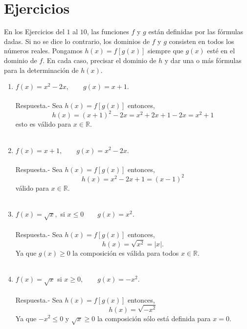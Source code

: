 \section{Ejercicios}

En los Ejercicios del $1$ al $10$, las funciones $f$ y $g$ están definidas por las fórmulas dadas. Si no se dice lo contrario, los dominios de $f$ y $g$ consisten en todos los números reales. Pongamos $h(x)=f[g(x)]$ siempre que $g(x)$ esté en el dominio de $f$. En cada caso, precisar el dominio de $h$ y dar una o más fórmulas para la determinación de $h(x)$.\\

\begin{enumerate}[\bfseries 1.]

    \item $f(x)=x^2-2x, \qquad g(x)=x+1$.\\\\
	Respuesta.- Sea $h(x)=f[g(x)]$ entonces,
	$$h(x)=(x+1)^2-2x = x^2+2x+1-2x = x^2+1$$
	esto es válido para $x\in \mathbb{R}$.\\\\


    \item $f(x)=x+1, \qquad g(x)=x^2-2x$.\\\\
	Respuesta.- Sea $h(x)=f[g(x)]$ entonces,
	$$h(x)=x^2-2x+1 = (x-1)^2$$
	válido para $x\in \mathbb{R}$.\\\\

    \item $f(x)=\sqrt{x},$ si $x\leq 0 \qquad g(x)=x^2.$\\\\
	Respuesta.- Sea $h(x)=f[g(x)]$ entonces,
	$$h(x)=\sqrt{x^2}=|x|.$$
	Ya que $g(x)\geq 0$ la composición es válida para todos $x\in \mathbb{R}$.\\\\

    \item $f(x)=\sqrt{x}$ si $x\geq 0, \qquad g(x)=-x^2$.\\\\
	Respuesta.- Sea $h(x)=f[g(x)]$ entonces,
	$$h(x)=\sqrt{-x^2}$$
	Ya que $-x^2\leq 0$ y $\sqrt{x}\geq 0$ la composición sólo está definida para $x=0$.\\\\


\end{enumerate}
